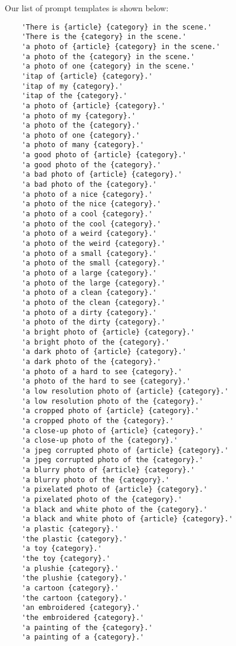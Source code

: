\documentclass{article} \usepackage{iclr2022_conference,times}
\begin{document}
Our list of prompt templates is shown below:
\begin{verbatim}
    'There is {article} {category} in the scene.'
    'There is the {category} in the scene.'
    'a photo of {article} {category} in the scene.'
    'a photo of the {category} in the scene.'
    'a photo of one {category} in the scene.'
    'itap of {article} {category}.'
    'itap of my {category}.'
    'itap of the {category}.'
    'a photo of {article} {category}.'
    'a photo of my {category}.'
    'a photo of the {category}.'
    'a photo of one {category}.'
    'a photo of many {category}.'
    'a good photo of {article} {category}.'
    'a good photo of the {category}.'
    'a bad photo of {article} {category}.'
    'a bad photo of the {category}.'
    'a photo of a nice {category}.'
    'a photo of the nice {category}.'
    'a photo of a cool {category}.'
    'a photo of the cool {category}.'
    'a photo of a weird {category}.'
    'a photo of the weird {category}.'
    'a photo of a small {category}.'
    'a photo of the small {category}.'
    'a photo of a large {category}.'
    'a photo of the large {category}.'
    'a photo of a clean {category}.'
    'a photo of the clean {category}.'
    'a photo of a dirty {category}.'
    'a photo of the dirty {category}.'
    'a bright photo of {article} {category}.'
    'a bright photo of the {category}.'
    'a dark photo of {article} {category}.'
    'a dark photo of the {category}.'
    'a photo of a hard to see {category}.'
    'a photo of the hard to see {category}.'
    'a low resolution photo of {article} {category}.'
    'a low resolution photo of the {category}.'
    'a cropped photo of {article} {category}.'
    'a cropped photo of the {category}.'
    'a close-up photo of {article} {category}.'
    'a close-up photo of the {category}.'
    'a jpeg corrupted photo of {article} {category}.'
    'a jpeg corrupted photo of the {category}.'
    'a blurry photo of {article} {category}.'
    'a blurry photo of the {category}.'
    'a pixelated photo of {article} {category}.'
    'a pixelated photo of the {category}.'
    'a black and white photo of the {category}.'
    'a black and white photo of {article} {category}.'
    'a plastic {category}.'
    'the plastic {category}.'
    'a toy {category}.'
    'the toy {category}.'
    'a plushie {category}.'
    'the plushie {category}.'
    'a cartoon {category}.'
    'the cartoon {category}.'
    'an embroidered {category}.'
    'the embroidered {category}.'
    'a painting of the {category}.'
    'a painting of a {category}.'
\end{verbatim}
\end{document}
